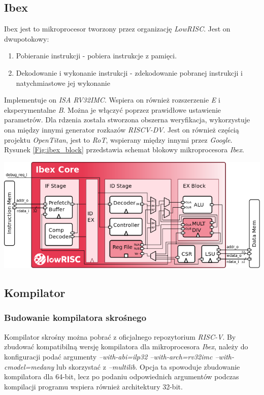 \documentclass[11pt,a4paper]{article}
\begin{document}
	\subsection{Ibex}
	\hspace{5mm}
		Ibex jest to mikroprocesor tworzony przez organizację \textit{LowRISC}. Jest on dwupotokowy:
\begin{enumerate}
	\item Pobieranie instrukcji - pobiera instrukcje z pamięci.
	\item Dekodowanie i wykonanie instrukcji - zdekodowanie pobranej instrukcji i natychmiastowe jej wykonanie
\end{enumerate}		
		 Implementuje on \textit{ISA RV32IMC}. Wspiera on również rozszerzenie \textit{E} i eksperymentalne \textit{B}. Można je włączyć poprzez prawidłowe ustawienie parametrów\cite{ibex_doc}. Dla rdzenia została stworzona obszerna weryfikacja, wykorzystuje ona między innymi generator rozkazów \textit{RISCV-DV}. Jest on również częścią projektu \textit{OpenTitan}, jest to \textit{RoT}, wspierany między innymi przez \textit{Google}\cite{google_opentitan}.
		Rysunek \ref{Fig:ibex_block} przedstawia schemat blokowy mikroprocesora \textit{Ibex}\cite{ibex_doc}.\\
			\begin{minipage}{\textwidth}

				\nopagebreak
				\begin{center}
					\includegraphics[width=14cm]{./rysunki/blockdiagram.png}
				\end{center}
			\end{minipage}
	\subsection{Kompilator}
		\subsubsection{Budowanie kompilatora skrośnego}
		\hspace{5mm}
			Kompilator skrośny można pobrać z oficjalnego repozytorium \textit{RISC-V}\cite{toolchain}. By zbudować kompatibilną wersję kompilatora dla mikroprocesora \textit{Ibex}, należy do konfiguracji podać argumenty \textit{--with-abi=ilp32 --with-arch=rv32imc --with-cmodel=medany} lub skorzystać z \textit{--multilib}. Opcja ta spowoduje zbudowanie kompilatora dla 64-bit, lecz po podaniu odpowiednich argumentów podczas kompilacji programu wspiera również architektury 32-bit.
\end{document}
